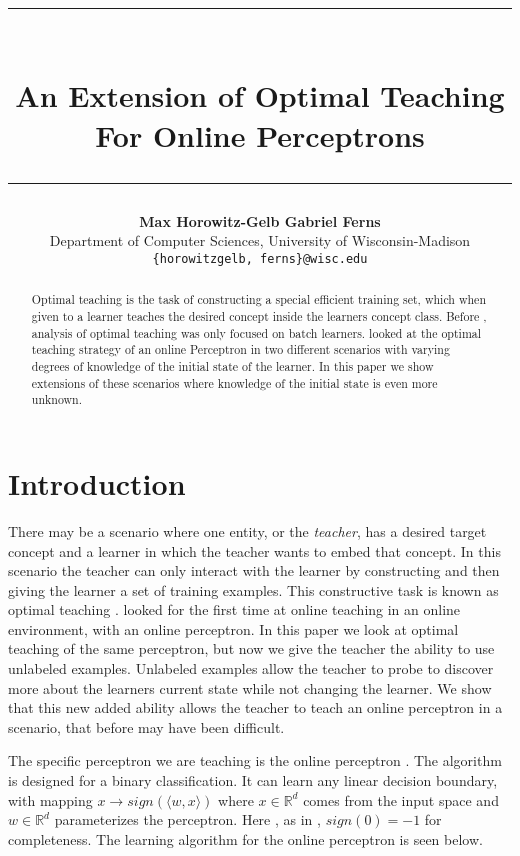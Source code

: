 \documentclass{article}
\title{\rule{350pt}{5pt}\\ \textbf{An Extension of Optimal Teaching For Online Perceptrons} \\ \rule{350pt}{1pt}}
\author{
  \textbf{Max Horowitz-Gelb \qquad Gabriel Ferns}\\
  Department of Computer Sciences, University of Wisconsin-Madison\\
  \texttt{\{horowitzgelb, ferns\}@wisc.edu}\\
}
\begin{document}

\maketitle

\begin{abstract}
  Optimal teaching is the task of constructing a special efficient training set, which when given to a learner teaches the desired concept inside the learners concept class. Before \cite{perceptron}, analysis of optimal teaching was only focused on batch learners. \cite{perceptron} looked at the optimal teaching strategy of an online Perceptron in two different scenarios with varying degrees of knowledge of the initial state of the learner. In this paper we show extensions of these scenarios where knowledge of the initial state is even more unknown.
\end{abstract}

\section{Introduction}
There may be a scenario where one entity, or the \textit{teacher},  has a desired target concept and a learner in which the teacher wants to embed that concept. In this scenario the teacher can only interact with the learner by constructing and then giving the learner a set of training examples. This constructive task is known as optimal teaching \cite{machine_teaching} \cite{teaching_dimension}. \cite{perceptron} looked for the first time at online teaching in an online environment, with an online perceptron. In this paper we look at optimal teaching of the same perceptron, but now we give the teacher the ability to use unlabeled examples. Unlabeled examples allow the teacher to probe to discover more about the learners current state while not changing the learner. We show that this new added ability allows the teacher to teach an online perceptron in a scenario, that before may have been difficult.

The specific perceptron we are teaching is the  online perceptron \cite{perceptron_algo}. The algorithm is designed for a binary classification. It can learn any linear decision boundary,
with mapping $x \to sign(\langle w, x \rangle)$ where $x \in \mathbb{R}^d$ comes from the input space and $w \in \mathbb{R}^d$ parameterizes the perceptron. Here , as in \cite{perceptron}, $sign(0) = -1$ for completeness. The learning algorithm for the online perceptron is seen below.
\end{document}
